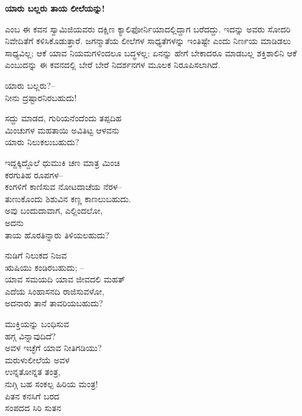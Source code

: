 \begin{center}
\textbf{ಯಾರು ಬಲ್ಲರು ತಾಯ ಲೀಲೆಯನ್ನು!}
\end{center}

 ಎಂಬ ಈ ಕವನ ಸ್ವಾಮಿಜಿಯವರು ದಕ್ಷಿಣ ಕ್ಯಾಲಿಫೋರ್ನಿಯಾದಲ್ಲಿದ್ದಾಗ ಬರೆದದ್ದು. ಇದನ್ನು ಅವರು ಸೋದರಿ ನಿವೇದಿತೆಗೆ ಕಳಿಸಿಕೊಡುತ್ತಾರೆ. ಜಗನ್ಮಾತೆಯ ಲೀಲೆಗಳ ಸಾಧ್ಯತೆಗಳನ್ನು ಇಂತಿಷ್ಟೇ ಎಂದು ನಿರ್ಣಯ ಮಾಡಿಡಲು ಸಾಧ್ಯವಿಲ್ಲ; ಆಕೆ ಯಾವ ನಿಯಮಗಳಿಂದಲೂ ಬದ್ಧಳಲ್ಲ; ಏನನ್ನು ಹೇಗೆ ಬೇಕಾದರೂ ಮಾಡಬಲ್ಲ ಶಕ್ತಿಶಾಲಿನಿ ಆಕೆ ಎಂಬುದನ್ನು ಈ ಕವನದಲ್ಲಿ ಬೇರೆ ಬೇರೆ ನಿದರ್ಶನಗಳ ಮೂಲಕ ನಿರೂಪಿಸಲಾಗಿದೆ.

ಯಾರು ಬಲ್ಲರು?–\\ನೀನು ದ್ರಷ್ಟಾರನಿರಬಹುದು!

\begin{myquote}
ಸದ್ದು ಮಾಡದ, ಗುರಿಯನೆಂದೆಂದು ತಪ್ಪದಿಹ\\ಮಿಂಚುಗಳ ಮಹತಾಯಿ ಅವಿತಿಟ್ಟ ಆಳವನು\\ಯಾರು ನಿಲುಕಲುಬಹುದು?
\end{myquote}

\begin{myquote}
ಇದ್ದಕ್ಕಿದ್ದೊಲೆ ಧುಮುಕಿ ಚಣ ಮಾತ್ರ ಮಿಂಚಿ\\ಕರಗುತಿಹ ರೂಪಗಳ–\\ಕಂಗಳಿಗೆ ಕಾಣಿಸುವ ನೋಟದಾಚೆಯ ನೆರಳ–\\ತುಣುಕೊಂದು ಶಿಶುವಿನ ಕಣ್ಣ ಕಾಣಲುಬಹುದು.\\ಅವು ಬಂದುದಾವಾಗ, ಎಲ್ಲಿಂದಲೋ,\\ಅದನು\\ತಾಯ ಹೊರತಿನ್ನಾರು ತಿಳಿಯಲಹುದು?
\end{myquote}

\begin{myquote}
ನುಡಿಗೆ ನಿಲುಕದ ನಿಜವ\\ಋಷಿಯು ಕಂಡಿರಬಹುದು; –\\ಯಾವ ಸಮಯದಿ ಯಾವ ಜೀವದಲಿ ಮಹತ್\\ಎದೆಯ ಸಿಂಹಾಸನದಿ ರಾಜಿಸುವಳೋ,\\ಅದನಾರು ತಾನೆ ತಾವರಿಯಬಹುದು?
\end{myquote}

\begin{myquote}
ಮುಕ್ತಿಯನ್ನು ಬಂಧಿಸುವ\\ಹಗ್ಗ ವಿನ್ನಾವುದಿದೆ?\\ಅವಳ ಇಚ್ಛೆಗೆ ಯಾವ ನೀತಿಗಡಿಯು?\\ಮರುಳುಲೀಲೆಯೆ ಅವಳ\\ಉನ್ನತೋನ್ನತ ತಂತ್ರ,\\ನುಗ್ಗಿ ಬಹ ಸಂಕಲ್ಪ ಹಿರಿಯ ಮಂತ್ರ!\\ಪಿತನ ಕನಸಿಗೆ ಬರದ\\ಸಂಪದದ ಸಿರಿ ಸುತನ
\end{myquote}

